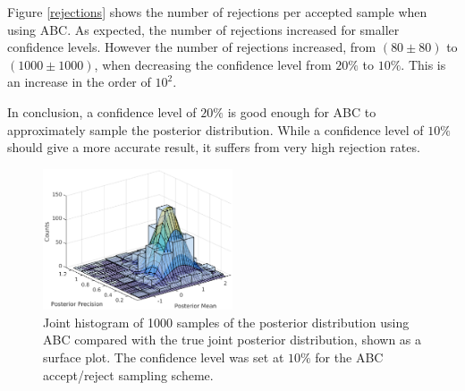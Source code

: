 \documentclass[a4paper,10pt]{article}
\begin{document}
Figure \ref{rejections} shows the number of rejections per accepted sample when using ABC. As expected, the number of rejections increased for smaller confidence levels. However the number of rejections increased, from $(80\pm80)$ to $(1000\pm1000)$, when decreasing the confidence level from $20\%$ to $10\%$. This is an increase in the order of $10^2$.

In conclusion, a confidence level of $20\%$ is good enough for ABC to approximately sample the posterior distribution. While a confidence level of $10\%$ should give a more accurate result, it suffers from very high rejection rates.

\begin{figure}
\centering
\includegraphics[width=0.5\textwidth]{surf.eps}
\caption{Joint histogram of 1000 samples of the posterior distribution using ABC compared with the true joint posterior distribution, shown as a surface plot. The confidence level was set at $10\%$ for the ABC accept/reject sampling scheme.}
\label{surf}
\end{figure}


\end{document}
